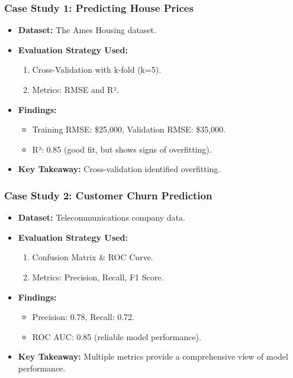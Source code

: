 \documentclass[aspectratio=169]{beamer}
\begin{document}
\begin{frame}[fragile]
  \frametitle{Case Study 1: Predicting House Prices}
  \begin{itemize}
    \item \textbf{Dataset:} The Ames Housing dataset.
    \item \textbf{Evaluation Strategy Used:}
      \begin{enumerate}
        \item Cross-Validation with k-fold (k=5).
        \item Metrics: RMSE and R².
      \end{enumerate}
    \item \textbf{Findings:}
      \begin{itemize}
        \item Training RMSE: \$25,000, Validation RMSE: \$35,000.
        \item R²: 0.85 (good fit, but shows signs of overfitting).
      \end{itemize}
    \item \textbf{Key Takeaway:} Cross-validation identified overfitting.
  \end{itemize}
\end{frame}

\begin{frame}[fragile]
  \frametitle{Case Study 2: Customer Churn Prediction}
  \begin{itemize}
    \item \textbf{Dataset:} Telecommunications company data.
    \item \textbf{Evaluation Strategy Used:}
      \begin{enumerate}
        \item Confusion Matrix & ROC Curve.
        \item Metrics: Precision, Recall, F1 Score.
      \end{enumerate}
    \item \textbf{Findings:}
      \begin{itemize}
        \item Precision: 0.78, Recall: 0.72.
        \item ROC AUC: 0.85 (reliable model performance).
      \end{itemize}
    \item \textbf{Key Takeaway:} Multiple metrics provide a comprehensive view of model performance.
  \end{itemize}
\end{frame}
\end{document}
